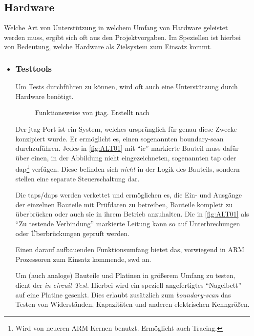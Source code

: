 \subsection{Hardware}\label{sub:hardware}
Welche Art von Unterstützung in welchem Umfang von Hardware geleistet werden
muss, ergibt sich oft aus den Projektvorgaben. Im Speziellen ist hierbei von
Bedeutung, welche Hardware als Zielsystem zum Einsatz kommt.
\begin{itemize}
  \item \subsubsection*{Testtools} Um Tests durchführen zu können, wird
  oft auch eine Unterstützung durch Hardware benötigt. 
  \begin{figure}[!ht]
    \centering
    \def\svgwidth{\columnwidth}
    
    \caption{Funktionsweise von \gls{jtag}. Erstellt nach \cite{ALT01}}
    \label{fig:ALT01}
  \end{figure}
  Der \gls{jtag}-Port ist ein System, welches ursprünglich für genau diese
  Zwecke konzipiert wurde. Er ermöglicht es, einen sogenannten boundary-scan
  durchzuführen. Jedes in \autoref{fig:ALT01} mit "`\gls{ic}"' markierte
  Bauteil muss dafür über einen, in der Abbildung nicht eingezeichneten, sogenannten \gls{tap} oder
  \gls{dap}\footnote{Wird von neueren ARM Kernen benutzt.
  Ermöglicht auch Tracing.} verfügen. Diese befinden sich \emph{nicht} in der
  Logik des Bauteils, sondern stellen eine separate Steuerschaltung dar.
  
  Die \glspl{tap}/\glspl{dap} werden verkettet und ermöglichen es, die Ein-
  und Ausgänge der einzelnen Bauteile mit Prüfdaten zu betreiben, Bauteile komplett
  zu überbrücken oder auch sie in ihrem Betrieb anzuhalten.
  Die in \autoref{fig:ALT01} als "`Zu testende Verbindung"' markierte Leitung
  kann so auf Unterbrechungen oder Überbrückungen geprüft werden.
  
  Einen darauf aufbauenden Funktionsumfang bietet das, vorwiegend in ARM
  Prozessoren zum Einsatz kommende, \gls{swd} an.
  
  Um (auch analoge) Bauteile und Platinen in größerem Umfang zu testen, dient
  der \emph{in-circuit Test}. Hierbei wird ein speziell angefertigtes
  "`Nagelbett"' auf eine Platine gesenkt. Dies erlaubt zusätzlich zum
  \emph{boundary-scan} das Testen von Widerständen, Kapazitäten und anderen
  elektrischen Kenngrößen.
   

\end{itemize}
